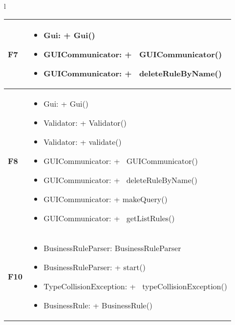 {{\begin{tabular}{l}
\begin{tabular}{||p{2cm}||p{10cm}||}
\textbf{F7} & 
\begin{itemize}
\item Gui: + Gui() 
\item GUICommunicator: +~ GUICommunicator()
\item GUICommunicator: +~ deleteRuleByName()
\end{itemize} \\ \hline
\textbf{F8} & 
\begin{itemize}
\item Gui: + Gui()
\item Validator: + Validator()
\item Validator: + validate()
\item GUICommunicator: +~ GUICommunicator()
\item GUICommunicator: +~ deleteRuleByName()
\item GUICommunicator: + makeQuery()
\item GUICommunicator: +~ getListRules()
\end{itemize} \\ \hline
\textbf{F10} & 
\begin{itemize}
\item BusinessRuleParser: BusinessRuleParser
\item BusinessRuleParser: + start()
\item TypeCollisionException: +~ typeCollisionException()
\item BusinessRule: + BusinessRule()
\end{itemize} \\
\hline
\end{tabular} \\
\end{tabular}
}

}
